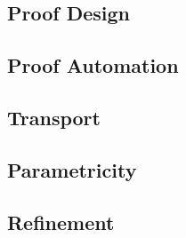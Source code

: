 \subsection*{Proof Design}

\subsection*{Proof Automation}

\subsection*{Transport}

\subsection*{Parametricity}

\subsection*{Refinement}

